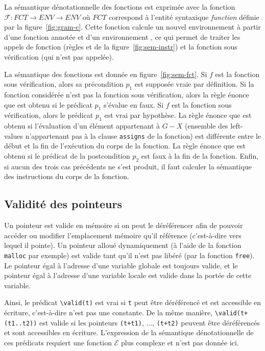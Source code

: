 


La sémantique dénotationnelle des fonctions est exprimée avec la fonction
$\mathcal{F} : FCT \rightarrow ENV \rightarrow ENV$ où $FCT$ correspond à
l'entité syntaxique \textit{function} définie par la figure~\ref{fig:gram-c}.
Cette fonction calcule un nouvel environnement à partir d'une
fonction annotée et d'un environnement \env, ce qui permet de traiter les appels
de fonction (règles  et  de la
figure~\ref{fig:sem-instr}) et la fonction sous vérification (qui n'est pas
appelée).

La sémantique des fonctions est donnée en figure~\ref{fig:sem-fct}.
Si $f$ est la fonction sous vérification, alors sa
précondition $p_1$ est supposée vraie par définition.
Si la fonction considérée n'est pas la fonction sous vérification, alors la
règle  énonce que \errorenv est obtenu si le prédicat
$p_1$ s'évalue en faux.
Si $f$ est la fonction sous vérification, alors le prédicat
$p_1$ est vrai par hypothèse.
La règle  énonce que \errorenv est obtenu si l'évaluation
d'un élément appartenant à $G-X$ (ensemble des left-values n'appartenant pas à
la clause \lstinline'assigns' de la fonction) est différente entre le début
et la fin de l'exécution du corps de la fonction.
La règle  énonce que \errorenv est obtenu si le prédicat de la
postcondition $p_2$ est faux à la fin de la fonction.
Enfin, si aucun des trois cas précédents ne s'est produit, il faut calculer la
sémantique des instructions du corps de la fonction.


\subsection{Validité des pointeurs}
\label{sec:ptr-valid}

Un pointeur est valide en mémoire si on peut le déréférencer afin de pouvoir
accéder ou modifier l'emplacement mémoire qu'il référence (c'est-à-dire vers
lequel il pointe).
Un pointeur alloué dynamiquement (à l'aide de la fonction \lstinline'malloc' par
exemple) est valide tant qu'il n'est pas libéré (par la fonction
\lstinline'free').
Le pointeur égal à l'adresse d'une variable globale est toujours valide, et le
pointeur égal à l'adresse d'une variable locale est valide dans la portée de
cette variable.

Ainsi, le prédicat \lstinline'\valid(t)' est vrai si \lstinline't'
peut être déréférencé et est accessible en écriture, c'est-à-dire n'est pas une
constante.
De la même manière, \lstinline'\valid(t+(t1..t2))' est valide si les pointeurs
\lstinline'(t+t1)', ..., \lstinline'(t+t2)' peuvent être déréférencés et sont
accessibles en écriture.
L'expression de la sémantique dénotationnelle de ces prédicats requiert une
fonction $\mathcal{E}$ plus complexe et n'est pas donnée ici.

